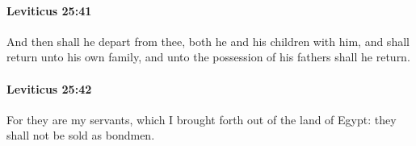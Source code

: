 		\paragraph{Leviticus 25:41} %
			\label{LEVITICUS-25-41}

			And then shall he depart from thee, both he and his children with him, and shall return unto his own family, and unto the possession of his fathers shall he return.


		\paragraph{Leviticus 25:42} %
			\label{LEVITICUS-25-42}

			For they are my servants, which I brought forth out of the land of Egypt: they shall not be sold as bondmen.


